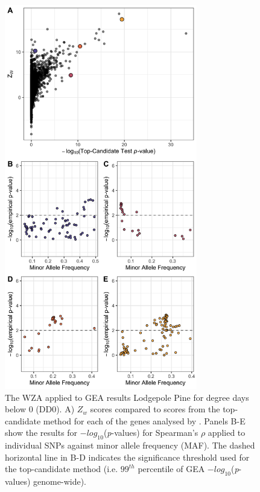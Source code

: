 \documentclass[10pt,twoside,lineno, twocolumn]{GSA_format}
\begin{document}
\begin{figure}[H]
  \includegraphics[width=0.75\textwidth,height=0.75\textheight,keepaspectratio]{../dataAnalsis/Z_v_MAF_DD0.png}
  \caption{The WZA applied to GEA results Lodgepole Pine for degree days below 0 (DD0). A) $Z_w$ scores compared to scores from the top-candidate method for each of the genes analysed by \cite{Yeaman2016}. Panels B-E show the results for $-log_{10}$(\textit{p}-values) for Spearman's $\rho$ applied to individual SNPs against minor allele frequency (MAF). The dashed horizontal line in B-D indicates the significance threshold used for the top-candidate method (i.e. $99^{th}$ percentile of GEA $-log_{10}$(\textit{p}-values) genome-wide).}

  \label{fig:lodgepole}
\end{figure}
\end{document}
